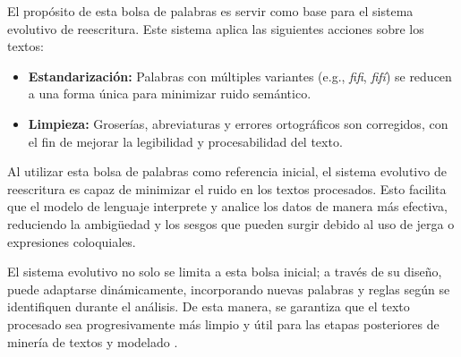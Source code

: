 \documentclass[10pt, a4paper]{article}
\begin{document}
	\begin{table}[H]
		\centering
		\caption{Ejemplo de palabras incluidas en la bolsa inicial.}
		\label{tab:bolsa_palabras}
	\end{table}
	
	
	El propósito de esta bolsa de palabras es servir como base para el sistema evolutivo de reescritura. Este sistema aplica las siguientes acciones sobre los textos:
	\begin{itemize}
		\item \textbf{Estandarización:} Palabras con múltiples variantes (e.g., \textit{fifi}, \textit{fifí}) se reducen a una forma única para minimizar ruido semántico.
		\item \textbf{Limpieza:} Groserías, abreviaturas y errores ortográficos son corregidos, con el fin de mejorar la legibilidad y procesabilidad del texto.
	\end{itemize}
	
	Al utilizar esta bolsa de palabras como referencia inicial, el sistema evolutivo de reescritura es capaz de minimizar el ruido en los textos procesados. Esto facilita que el modelo de lenguaje interprete y analice los datos de manera más efectiva, reduciendo la ambigüedad y los sesgos que pueden surgir debido al uso de jerga o expresiones coloquiales.
	
	El sistema evolutivo no solo se limita a esta bolsa inicial; a través de su diseño, puede adaptarse dinámicamente, incorporando nuevas palabras y reglas según se identifiquen durante el análisis. De esta manera, se garantiza que el texto procesado sea progresivamente más limpio y útil para las etapas posteriores de minería de textos y modelado \parencite{galindo1991sistemas}.
	
\end{document}
